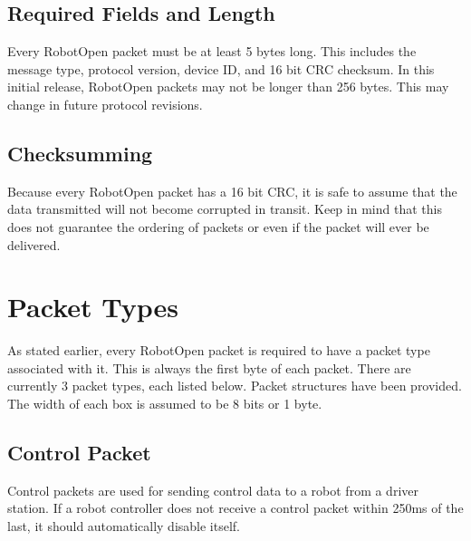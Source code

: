 \documentclass[11pt]{article} %
\begin{document}
\subsection{Required Fields and Length}
Every RobotOpen packet must be at least 5 bytes long. This includes the message type, protocol version, device ID, and 16 bit CRC checksum. In this initial release, RobotOpen packets may not be longer than 256 bytes. This may change in future protocol revisions.

\subsection{Checksumming}
Because every RobotOpen packet has a 16 bit CRC, it is safe to assume that the data transmitted will not become corrupted in transit. Keep in mind that this does not guarantee the ordering of packets or even if the packet will ever be delivered.

\newpage

\section*{}
\section{Packet Types}
As stated earlier, every RobotOpen packet is required to have a packet type associated with it. This is always the first byte of each packet. There are currently 3 packet types, each listed below. Packet structures have been provided. The width of each box is assumed to be 8 bits or 1 byte.

\subsection{Control Packet}

Control packets are used for sending control data to a robot from a driver station. If a robot controller does not receive a control packet within 250ms of the last, it should automatically disable itself.
\vspace{30px}
\end{document}
